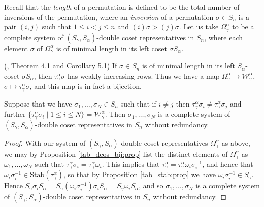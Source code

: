 \documentclass[ALCO,Unicode,published]{cedram}
\begin{document}
Recall that the \textit{length} of a permutation is defined to be the total number of inversions of the permutation, where an
\textit{inversion} of a permutation $\sigma \in S_n$ is a pair $(i,j)$ such that $1 \leq i < j \leq n$ and $(i)\sigma > (j)\sigma$.
Let us take $\Omega^\alpha_{\gamma}$ to be a complete system of $(S_\gamma,S_\alpha)$-double coset representatives in $S_n$, where each element
$\sigma$ of $\Omega^\alpha_\gamma$ is of minimal length in its left coset $\sigma S_\alpha$.

\begin{prop}\label{tab_dcos_bij:prop}\textup{(}\cite{WLDDCR}, Theorem 4.1 and Corollary 5.1\textup{)}
If $\sigma \in S_n$ is of minimal length in its left $S_\alpha$-coset $\sigma S_\alpha$, then $\tau^\alpha_{\gamma}\sigma$ has
weakly increasing rows. Thus we have a map
$\Omega^\alpha_\gamma \longrightarrow \mathcal{W}^\alpha_\gamma$, $\sigma \longmapsto \tau^\alpha_\gamma\sigma$, and this map is in fact a
bijection.
\end{prop}

\begin{coro}\label{tabs_give_cosets:cor}
Suppose that we have $\sigma_1,\ldots,\sigma_N \in S_n$ such that if $i \neq j$ then
$\tau^\alpha_\gamma\sigma_i \neq \tau^\alpha_\gamma\sigma_j$ and further $\{\tau^\alpha_\gamma\sigma_i \mid 1 \leqslant i \leqslant N\} =
\mathcal{W}^\alpha_\gamma$. Then $\sigma_1,\ldots,\sigma_N$ is a complete system of $(S_\gamma,S_\alpha)$-double coset representatives in
$S_n$ without redundancy.
\end{coro}
\begin{proof}
With our system of $(S_\gamma,S_\alpha)$-double coset representatives $\Omega^\alpha_{\gamma}$ as above, we may by Proposition
\ref{tab_dcos_bij:prop} list the distinct elements of $\Omega^\alpha_{\gamma}$ as $\omega_1,\ldots,\omega_N$ such that
$\tau^\alpha_\gamma\sigma_i = \tau^\alpha_\gamma\omega_i$. This implies that $\tau^\alpha_\gamma = \tau^\alpha_\gamma\omega_i\sigma_i^{-1}$, and
hence that $\omega_i\sigma_i^{-1} \in \mathrm{Stab}(\tau^\alpha_\gamma)$, so that by Proposition \ref{tab_stab:prop} we have
$\omega_i\sigma_i^{-1} \in S_\gamma$. Hence $S_\gamma \sigma_i S_\alpha = S_\gamma (\omega_i\sigma_i^{-1}) \sigma_i S_\alpha =
S_\gamma \omega_i S_\alpha$, and so $\sigma_1,\ldots,\sigma_N$ is a complete system of $(S_\gamma,S_\alpha)$-double coset representatives in
$S_n$ without redundancy.
\end{proof}
\end{document}
